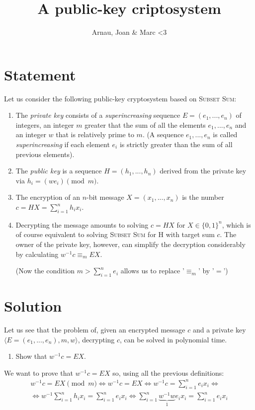 \documentclass[a4paper]{article}
\title{A public-key criptosystem}
\author{Arnau, Joan \& Marc  <3}
\begin{document}
\maketitle
\section*{Statement}
Let us consider the following public-key cryptosystem based on \textsc{Subset Sum}:

\begin{enumerate}[label=\alph*)]
	\item The \emph{private key} consists of a \emph{superincreasing} sequence $E = (e_1, ..., e_n)$ of integers, an integer $m$ greater that the sum of all the elements $e_1, ..., e_n$ and an integer $w$ that is relatively prime to $m$. (A sequence $e_1, ..., e_n$ is called \emph{superincreasing} if each element $e_i$ is strictly greater than the sum of all previous elements).
	\item The \emph{public key} is a sequence $H = (h_1, ..., h_n)$ derived from the private key via $h_i = (we_i) \pmod{m}$.
	\item The encryption of an $n$-bit message $X = (x_1, ..., x_n)$ is the number $c = HX = \sum_{i=1}^n h_ix_i$.
	\item Decrypting the message amounts to solving $c = HX$ for $X \in \{0, 1\}^n$, which is of course equivalent to solving \textsc{Subset Sum} for H with target sum $c$. The owner of the private key, however, can simplify the decryption considerably by calculating $w^{-1}c \equiv_m EX$.
	
	(Now the condition $m > \sum_{i=1}^n e_i$ allows us to replace '$\equiv_m$' by '$=$')
\end{enumerate}

\section*{Solution}
Let us see that the problem of, given an encrypted message $c$ and a private key $\langle E = (e_1, ..., e_n), m, w \rangle$, decrypting $c$, can be solved in polynomial time.
\begin{enumerate}[label=\roman*)]
	\item Show that $w^{-1}c = EX$.
\end{enumerate}
We want to prove that $w^{-1}c = EX$ so, using all the previous definitions:
\begin{gather*}
	w^{-1}c = EX \pmod{m} \iff w^{-1}c = EX \iff w^{-1}c = \sum_{i=1}^{n} e_i x_i \iff \\
	\iff w^{-1} \sum_{i=1}^n h_i x_i = \sum_{i=1}^n e_i x_i \iff \sum_{i=1}^n \underbrace{w^{-1}w}_1 e_i x_i = \sum_{i=1}^n e_i x_i
\end{gather*}
\end{document}
